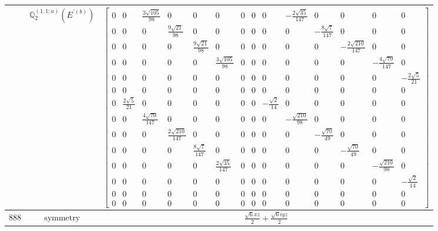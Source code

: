 \documentclass[fleqn,8pt,landscape]{jsarticle}
\begin{document}
\begin{longtable}{ccc}
$  $ & $ \mathbb{Q}_{2}^{(1,1;a)}(E^{\prime(b)}) $ & $ \begin{bmatrix} 0 & 0 & \frac{3 \sqrt{105}}{98} & 0 & 0 & 0 & 0 & 0 & 0 & - \frac{2 \sqrt{35}}{147} & 0 & 0 & 0 & 0 \\ 0 & 0 & 0 & \frac{9 \sqrt{21}}{98} & 0 & 0 & 0 & 0 & 0 & 0 & - \frac{8 \sqrt{7}}{147} & 0 & 0 & 0 \\ 0 & 0 & 0 & 0 & \frac{9 \sqrt{21}}{98} & 0 & 0 & 0 & 0 & 0 & 0 & - \frac{2 \sqrt{210}}{147} & 0 & 0 \\ 0 & 0 & 0 & 0 & 0 & \frac{3 \sqrt{105}}{98} & 0 & 0 & 0 & 0 & 0 & 0 & - \frac{4 \sqrt{70}}{147} & 0 \\ 0 & 0 & 0 & 0 & 0 & 0 & 0 & 0 & 0 & 0 & 0 & 0 & 0 & - \frac{2 \sqrt{5}}{21} \\ 0 & 0 & 0 & 0 & 0 & 0 & 0 & 0 & 0 & 0 & 0 & 0 & 0 & 0 \\ 0 & \frac{2 \sqrt{5}}{21} & 0 & 0 & 0 & 0 & 0 & 0 & - \frac{\sqrt{2}}{14} & 0 & 0 & 0 & 0 & 0 \\ 0 & 0 & \frac{4 \sqrt{70}}{147} & 0 & 0 & 0 & 0 & 0 & 0 & - \frac{\sqrt{210}}{98} & 0 & 0 & 0 & 0 \\ 0 & 0 & 0 & \frac{2 \sqrt{210}}{147} & 0 & 0 & 0 & 0 & 0 & 0 & - \frac{\sqrt{70}}{49} & 0 & 0 & 0 \\ 0 & 0 & 0 & 0 & \frac{8 \sqrt{7}}{147} & 0 & 0 & 0 & 0 & 0 & 0 & - \frac{\sqrt{70}}{49} & 0 & 0 \\ 0 & 0 & 0 & 0 & 0 & \frac{2 \sqrt{35}}{147} & 0 & 0 & 0 & 0 & 0 & 0 & - \frac{\sqrt{210}}{98} & 0 \\ 0 & 0 & 0 & 0 & 0 & 0 & 0 & 0 & 0 & 0 & 0 & 0 & 0 & - \frac{\sqrt{2}}{14} \\ 0 & 0 & 0 & 0 & 0 & 0 & 0 & 0 & 0 & 0 & 0 & 0 & 0 & 0 \\ 0 & 0 & 0 & 0 & 0 & 0 & 0 & 0 & 0 & 0 & 0 & 0 & 0 & 0 \end{bmatrix} $ \\ \hline
$ 888 $ & $ \text{symmetry} $ & $ \frac{\sqrt{6} x z}{2} + \frac{\sqrt{6} i y z}{2} $ \\

\end{longtable}
\end{document}
